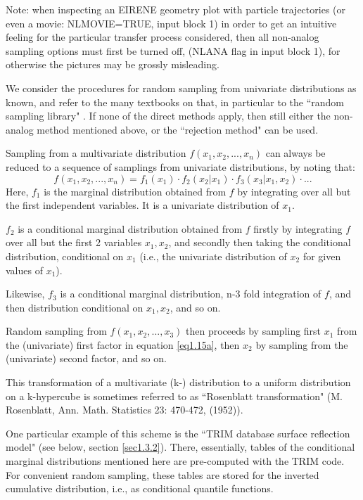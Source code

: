 Note: when inspecting an EIRENE geometry plot with particle
trajectories (or even a movie: NLMOVIE=TRUE, input block 1) in
order to get an intuitive feeling for the particular transfer
process considered, then all non-analog sampling options must
first be turned off, (NLANA flag in input block 1), for otherwise
the pictures may be grossly misleading.

\medskip
We consider the procedures for random sampling from univariate
distributions as known, and refer to the many textbooks on that,
in particular to the ``random sampling library"
\cite{kn:Sampling}. If none of the direct methods apply, then
still either the non-analog method mentioned above, or the
``rejection method" can be used.

Sampling from a multivariate distribution $f(x_1,x_2,...,x_n)$ can
always be reduced to a sequence of samplings from univariate
distributions, by noting that:
\begin{equation} \label{eq1.15a}
f(x_1,x_2,...,x_n)=f_1(x_1) \cdot f_2(x_2|x_1) \cdot
f_3(x_3|x_1,x_2) \cdot ...
\end{equation}
Here, $f_1$ is the marginal distribution obtained from $f$ by
integrating over all but the first independent variables. It is a
univariate distribution of $x_1$.

$f_2$ is a conditional marginal distribution obtained from $f$
firstly by integrating $f$ over all but the first 2 variables
$x_1, x_2$, and secondly then taking the conditional distribution,
conditional on $x_1$ (i.e., the univariate distribution of $x_2$
for given values of $x_1$).

Likewise, $f_3$ is a conditional marginal distribution, n-3 fold
integration of $f$, and then distribution conditional on $x_1, x_2$,
and so on.

Random sampling from $f(x_1,x_2,...,x_3)$ then proceeds by
sampling first $x_1$ from the (univariate) first factor in
equation \ref{eq1.15a}, then $x_2$ by sampling from the
(univariate) second factor, and so on.

This transformation of a multivariate (k-) distribution to a uniform distribution
on a k-hypercube is sometimes referred to as ``Rosenblatt transformation" (M. Rosenblatt, Ann. Math. Statistics 23: 470-472, (1952)).

One particular example of this scheme is the ``TRIM database
surface reflection model" (see below, section \ref{sec1.3.2}).
There, essentially, tables of the conditional marginal
distributions mentioned here are pre-computed with the TRIM code.
For convenient random sampling, these tables are stored for the
inverted cumulative distribution, i.e., as conditional quantile
functions.

